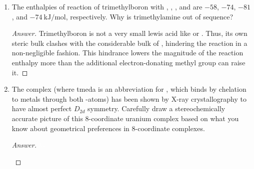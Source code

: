 \documentclass[../psets.tex]{subfiles}
\begin{document}
\begin{enumerate}[label={\Roman*)}]
\begin{enumerate}[label={\textbf{9.\arabic*}}]
        \begin{proof}[Answer]
            Since there are two resonances, there are two types of bonds. Additionally, the $2:1$ ratio tells us that the doublet bonds are twice as strong as the triplet bonds. Thus, the most likely structure is
            \begin{center}
                \chemleft{[}
                \chemright{]^+}
            \end{center}
            Its point group is $C_{2v}$.
        \end{proof}
    \end{enumerate}
    \newpage
    \item The enthalpies of reaction of trimethylboron with , , , and  are $-58$, $-74$, $-81$, and $\SI[per-mode=symbol]{-74}{\kilo\joule\per\mole}$, respectively. Why is trimethylamine out of sequence?
    \begin{proof}[Answer]
        Trimethylboron is not a very small lewis acid like  or . Thus, its own steric bulk clashes with the considerable bulk of , hindering the reaction in a non-negligible fashion. This hindrance lowers the magnitude of the reaction enthalpy more than the additional electron-donating methyl group can raise it.
    \end{proof}
    \newpage
    \item The complex  (where tmeda is an abbreviation for , which binds by chelation to metals through both -atoms) has been shown by X-ray crystallography to have almost perfect $D_{2d}$ symmetry. Carefully draw a stereochemically accurate picture of this 8-coordinate uranium complex based on what you know about geometrical preferences in 8-coordinate complexes.
    \begin{proof}[Answer]
        ${\color{white}hi}$
        \begin{center}
        \end{center}
    \end{proof}
\end{enumerate}
\end{document}
